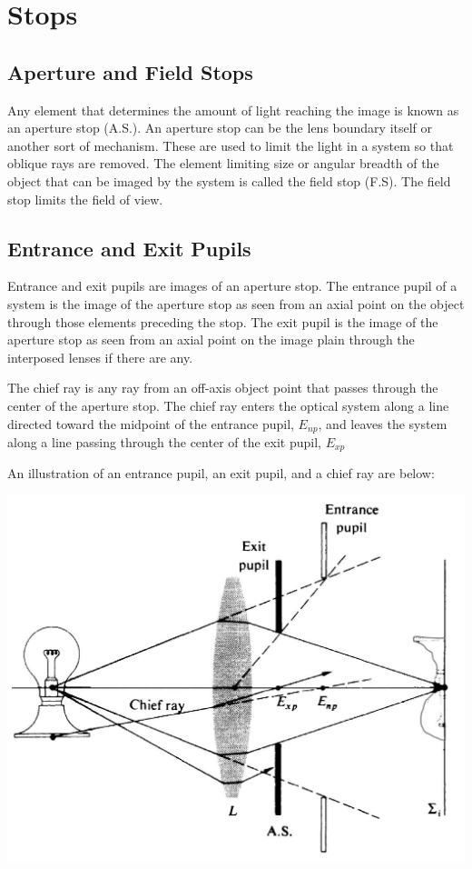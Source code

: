\documentclass[12pt]{report}
\begin{document}
\section{Stops}
\subsection{Aperture and Field Stops}
Any element that determines the amount of light reaching the image is known as an aperture stop (A.S.). An aperture stop can be the lens boundary itself or another sort of mechanism. These are used to limit the light in a system so that oblique rays are removed. The element limiting size or angular breadth of the object that can be imaged by the system is called the field stop (F.S). The field stop limits the field of view.  
\subsection{Entrance and Exit Pupils}
Entrance and exit pupils are images of an aperture stop. The entrance pupil of a system is the image of the aperture stop as seen from an axial point on the object through those elements preceding the stop. The exit pupil is the image of the aperture stop as seen from an axial point on the image plain through the interposed lenses if there are any. 

The chief ray is any ray from an off-axis object point that passes through the center of the aperture stop. The chief ray enters the optical system along a line directed toward the midpoint of the entrance pupil, $E_{np}$, and leaves the system along a line passing through the center of the exit pupil, $E_{xp}$ 

An illustration of an entrance pupil, an exit pupil, and a chief ray are below:

\includegraphics[scale=.25]{ChiefRay.jpg}
\end{document}
